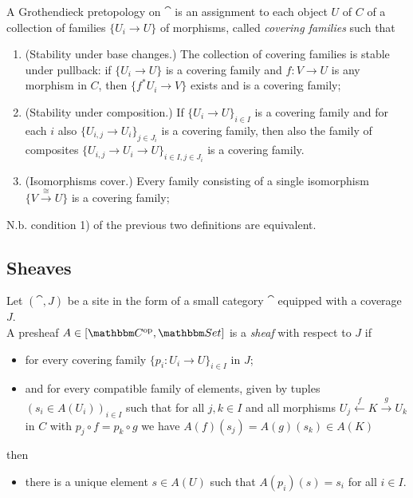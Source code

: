 \documentclass[a4paper,11pt]{article}  %
\begin{document}
\begin{definition}
A Grothendieck pretopology on $\cat$ is an assignment to each object  $U$ of $C$ of a collection of families $\{U_i \to U\}$ of morphisms, called \emph{covering families} such that
\begin{enumerate}
	\item (Stability under base changes.)
The collection of covering families is stable under pullback: if $\{U_i \to U\}$ is a covering family and $f : V \to U$ is any morphism in $C$, then $\{f^* U_i \to V\}$ exists and is a covering family;
	\item (Stability under composition.)
If $\{U_i \to U\}_{i \in I}$ is a covering family and for each $i$ also $\{U_{i,j} \to U_i\}_{j \in J_i}$ is a covering family, then also the family of composites $\{U_{i,j} \to U_i \to U\}_{i\in I, j \in J_i}$ is a covering family.
	\item (Isomorphisms cover.)
Every family consisting of a single isomorphism $\{V \stackrel{\cong}{\to}U\}$ is a covering family;
\end{enumerate}
\end{definition}

N.b. condition 1) of the previous two definitions are equivalent.







\subsection{Sheaves}
%
\begin{definition}[Sheaf]
Let $(\cat,J)$ be a site in the form of a small category $\cat$ equipped with a coverage $J$.
\\
A presheaf $A \in [\cat^\op,\Set]$ is a \emph{sheaf} with respect to $J$ if
\begin{itemize}
	\item for every covering family $\{p_i : U_i \to U\}_{i \in I}$ in $J$;
	\item and for every compatible family of elements, given by tuples $(s_i \in A(U_i))_{i \in I}$ such that for all $j,k \in I$ and all morphisms $U_j \stackrel{f}{\leftarrow} K \stackrel{g}{\to} U_k$ in $C$ with $p_j \circ f = p_k \circ g$ we have $A(f)(s_j) = A(g)(s_k) \in A(K)$
\end{itemize}
then
\begin{itemize}
	\item there is a  unique  element $s \in A(U)$ such that $A(p_i)(s) = s_i$ for all $i \in I$.
\end{itemize}
\end{definition}
\end{document}
